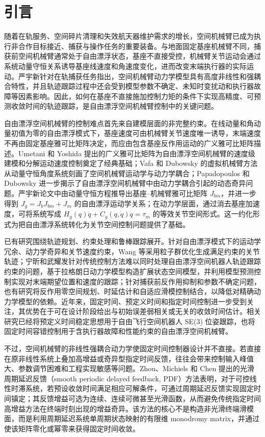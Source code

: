\section{引言}

随着在轨服务、空间碎片清理和失效航天器维护需求的增长，空间机械臂已成为执行非合作目标接近、捕获与操作任务的重要装备。与地面固定基座机械臂不同，捕获前空间机械臂通常处于自由漂浮状态，基座不直接受控，机械臂关节运动会通过系统动量守恒关系诱导基座线速度和角速度变化，进而改变末端执行器的实际运动。严宇新针对在轨捕获任务指出，空间机械臂动力学模型具有高度非线性和强耦合特性，并且轨迹跟踪过程中还会受到模型参数不确定、未知时变扰动和执行器故障等因素影响\cite{yan}。因此，如何在基座不直接施加控制力矩的条件下实现高精度、可预测收敛时间的轨迹跟踪，是自由漂浮空间机械臂控制中的关键问题。

自由漂浮空间机械臂的控制难点首先来自建模层面的非完整约束。在线动量和角动量初值为零的自由漂浮模式下，基座速度可由机械臂关节速度唯一诱导，末端速度不再由固定基座雅可比矩阵决定，而应由包含基座反作用运动的广义雅可比矩阵描述。Umetani 和 Yoshida 提出的广义雅可比矩阵为自由漂浮空间机械臂的速度级建模和分解运动速度控制奠定了经典基础\cite{umetani1989}；Vafa 和 Dubowsky 的虚拟机械臂方法从动量守恒角度系统刻画了空间机械臂运动学与动力学耦合\cite{vafa1990}；Papadopoulos 和 Dubowsky 进一步揭示了自由漂浮空间机械臂中由动力学耦合引起的动态奇异问题\cite{papadopoulos1993}。严宇新论文中由动量守恒方程推导出基座--机械臂雅可比矩阵 \(J_{bm}\)，并进一步得到 \(J_g=J_bJ_{bm}+J_m\) 的自由漂浮运动学关系；在动力学层面，通过消去基座加速度，可将系统写成 \(H_g(q)\ddot q+C_g(q,\dot q)\dot q=\tau_m\) 的等效关节空间形式\cite{yan}。这一约化形式为把自由漂浮系统转化为关节空间控制问题提供了基础。

已有研究围绕轨迹规划、约束处理和鲁棒跟踪展开。针对自由漂浮模式下的运动学冗余、动力学奇异和关节速度约束，Wang 等采用粒子群优化生成满足约束的关节轨迹\cite{wang2015}；宁昕和武耀发针对传统控制方法难以同时处理自由漂浮空间机器人轨迹跟踪约束的问题，基于拉格朗日动力学模型构造扩展状态空间模型，并利用模型预测控制实现对末端期望位置和速度的跟踪\cite{ning2019}；针对捕获前反作用抑制和参数不确定问题，也有研究将反作用零空间规划、时延估计和自适应滑模控制结合，以降低对精确动力学模型的依赖\cite{yu2022}。近年来，固定时间、预定义时间和指定时间控制进一步受到关注，其优势在于可在设计阶段给出与初始误差弱相关或无关的收敛时间估计。相关研究已经将预定义时间稳定思想用于自由飞行空间机器人 SE(3) 位姿跟踪\cite{xuPredefinedTimeTrackingControl2024}，也将固定时间容错控制用于含执行器故障和性能约束的自由漂浮空间机械臂\cite{li2025}。

不过，空间机械臂的非线性强耦合动力学使固定时间控制器设计并不直接。若直接在原非线性系统上叠加高增益或奇异型指定时间反馈，往往会带来控制输入峰值大、参数调节困难和工程实现敏感等问题。Zhou、Michiels 和 Chen 提出的光滑周期延迟反馈（smooth periodic delayed feedback, PDF）方法表明，对于可控线性时滞系统，若预设收敛时间满足相应可解条件，可通过周期延迟反馈实现固定时间镇定；其反馈增益可选为连续、连续可微甚至光滑函数，从而避免传统指定时间高增益方法在终端时刻出现的增益奇异\cite{zhouFixedtimeStabilizationLinear2022}。该方法的核心不是构造非光滑终端滑模面，而是利用周期延迟系统单周期状态映射的有限维 monodromy matrix，并通过使该矩阵零化或幂零来获得固定时间收敛。

